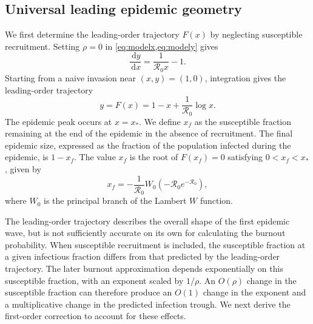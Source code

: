 \documentclass[11pt]{article}
\newcommand{\Rzero}{\mathcal R_0}
\newcommand{\rhoeps}{\rho}
\newcommand{\xf}{x_f}
\newcommand{\xs}{x_*}
\newcommand{\dd}{\,\mathrm d}
\begin{document}
\subsection{Universal leading epidemic geometry}
We first determine the leading-order trajectory \(F(x)\) by neglecting susceptible recruitment. Setting \(\rhoeps=0\) in \cref{eq:modelx,eq:modely} gives
\[
\frac{\dd y}{\dd x}=\frac{1}{\Rzero x}-1.
\]
Starting from a naive invasion near \((x,y)=(1,0)\), integration gives the leading-order trajectory
\begin{equation}
y=F(x)=1-x+\frac{1}{\Rzero}\log x.
\label{eq:F}
\end{equation}
The epidemic peak occurs at \(x=\xs\). We define \(\xf\) as the susceptible fraction remaining at the end of the epidemic in the absence of recruitment. The final epidemic size, expressed as the fraction of the population infected during the epidemic, is \(1-\xf\). The value \(\xf\) is the root of \(F(\xf)=0\) satisfying \(0<\xf<\xs\), given by
\begin{equation}
\xf=-\frac{1}{\Rzero}W_0(-\Rzero e^{-\Rzero}),
\label{eq:xf}
\end{equation}
where \(W_0\) is the principal branch of the Lambert \(W\) function.

The leading-order trajectory describes the overall shape of the first epidemic wave, but is not sufficiently accurate on its own for calculating the burnout probability. When susceptible recruitment is included, the susceptible fraction at a given infectious fraction differs from that predicted by the leading-order trajectory. The later burnout approximation depends exponentially on this susceptible fraction, with an exponent scaled by \(1/\rhoeps\). An \(O(\rhoeps)\) change in the susceptible fraction can therefore produce an \(O(1)\) change in the exponent and a multiplicative change in the predicted infection trough. We next derive the first-order correction to account for these effects.
\end{document}
